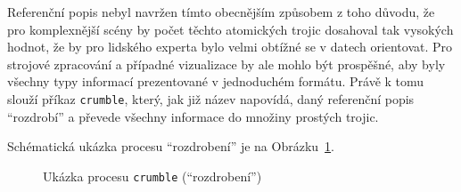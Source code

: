 \begin{enumerate}
	      Referenční popis nebyl navržen tímto obecnějším způsobem z toho důvodu, že pro komplexnější scény by počet těchto atomických trojic dosahoval tak vysokých hodnot,
	      že by pro lidského experta bylo velmi obtížné se v datech orientovat.
	      Pro strojové zpracování a případné vizualizace by ale mohlo být prospěšné, aby byly všechny typy informací prezentované v jednoduchém formátu.
	      Právě k tomu slouží příkaz \texttt{crumble}, který, jak již název napovídá, daný referenční popis \enquote{rozdrobí} a převede všechny informace do množiny prostých trojic.

	      Schématická ukázka procesu \enquote{rozdrobení} je na Obrázku~\ref{fig:crumble_example}.
	      \begin{figure}[ht!]
		      \centering
		      \caption{Ukázka procesu \texttt{crumble} (\enquote{rozdrobení})}\label{fig:crumble_example}
	      \end{figure}


\end{enumerate}
